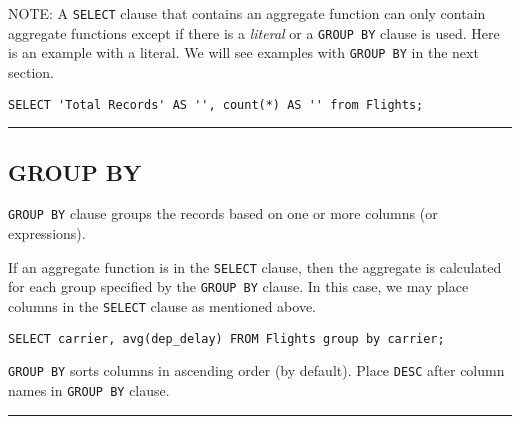 \documentclass{article}
\begin{document}
  
  
  
   
   
\noindent NOTE: A \texttt{SELECT} clause that contains an aggregate function
can only contain aggregate functions except if there is a \textit{literal}
or a \texttt{GROUP\ BY} clause is used.  Here is an example with a literal.  We will see examples with \texttt{GROUP BY} in the next section.  

     
\begin{lstlisting}[frame=single]  
SELECT 'Total Records' AS '', count(*) AS '' from Flights;
\end{lstlisting}  

\hspace{-0.5cm}\rule[-0.101in]{\textwidth}{0.0025in}
    
  
  
  
  
  
  
\subsection*{GROUP BY}

  


\begin{outline}
 
     \1 \texttt{GROUP BY}  clause groups the records based on one or more columns (or expressions).

    \1 If an aggregate function is in the \texttt{SELECT} clause, then the aggregate is calculated for each group specified by the \texttt{GROUP BY} clause.  In this case, we may place columns in the \texttt{SELECT} clause as mentioned above. 

   
\begin{lstlisting}[frame=single]  
SELECT carrier, avg(dep_delay) FROM Flights group by carrier;
\end{lstlisting}  
\vspace{-0.5cm}
 
    \1 \texttt{GROUP BY} sorts columns in ascending order (by default).  Place \texttt{DESC} after column names in \texttt{GROUP BY}  clause.
    
   
\end{outline}
  
  
\hspace{-0.5cm}\rule[-0.101in]{\textwidth}{0.0025in}
   
\end{document}
